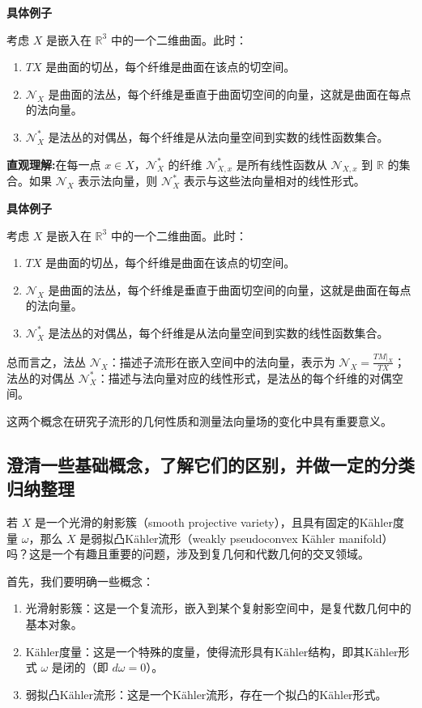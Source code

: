 \documentclass[lang=cn,12pt,fontset=none,a4paper]{beautybook}
\begin{document}
\textbf{具体例子}

考虑 \( X \) 是嵌入在 \( \mathbb{R}^3 \) 中的一个二维曲面。此时：
\begin{enumerate}
  \item \( TX \) 是曲面的切丛，每个纤维是曲面在该点的切空间。
  \item \( \mathcal{N}_X \) 是曲面的法丛，每个纤维是垂直于曲面切空间的向量，这就是曲面在每点的法向量。
  \item \( \mathcal{N}_X^* \) 是法丛的对偶丛，每个纤维是从法向量空间到实数的线性函数集合。
\end{enumerate}

\textbf{直观理解:}在每一点 \( x \in X \)，\( \mathcal{N}_X^* \) 的纤维 \( \mathcal{N}_{X,x}^* \) 是所有线性函数从 \( \mathcal{N}_{X,x} \) 到 \( \mathbb{R} \) 的集合。如果 \( \mathcal{N}_X \) 表示法向量，则 \( \mathcal{N}_X^* \) 表示与这些法向量相对的线性形式。

\textbf{具体例子}

考虑 \( X \) 是嵌入在 \( \mathbb{R}^3 \) 中的一个二维曲面。此时：
\begin{enumerate}
  \item \( TX \) 是曲面的切丛，每个纤维是曲面在该点的切空间。
  \item \( \mathcal{N}_X \) 是曲面的法丛，每个纤维是垂直于曲面切空间的向量，这就是曲面在每点的法向量。
  \item \( \mathcal{N}_X^* \) 是法丛的对偶丛，每个纤维是从法向量空间到实数的线性函数集合。
\end{enumerate}

总而言之，法丛 \( \mathcal{N}_X \)：描述子流形在嵌入空间中的法向量，表示为 \( \mathcal{N}_X = \frac{TM|_X}{TX} \)；
法丛的对偶丛 \( \mathcal{N}_X^* \)：描述与法向量对应的线性形式，是法丛的每个纤维的对偶空间。

这两个概念在研究子流形的几何性质和测量法向量场的变化中具有重要意义。


\subsection{澄清一些基础概念，了解它们的区别，并做一定的分类归纳整理}

若 \( X \) 是一个光滑的射影簇（smooth projective variety），且具有固定的Kähler度量 \(\omega\)，那么 \( X \) 是弱拟凸Kähler流形（weakly pseudoconvex Kähler manifold）吗？这是一个有趣且重要的问题，涉及到复几何和代数几何的交叉领域。

首先，我们要明确一些概念：
\begin{enumerate}
  \item 光滑射影簇：这是一个复流形，嵌入到某个复射影空间中，是复代数几何中的基本对象。
  \item Kähler度量：这是一个特殊的度量，使得流形具有Kähler结构，即其Kähler形式 \( \omega \) 是闭的（即 \( d\omega = 0 \)）。
  \item 弱拟凸Kähler流形：这是一个Kähler流形，存在一个拟凸的Kähler形式。
\end{enumerate}
\end{document}
